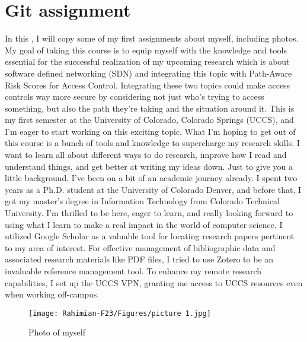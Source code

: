 \section{Git assignment}

\begin{text}
In this , I will copy some of my first assignments about myself, including photos. 
My goal of taking this course is to equip myself with the knowledge and tools essential for the successful realization of my upcoming research which is about software defined networking (SDN) and integrating this topic with Path-Aware Risk Scores for Access Control. Integrating these two topics could make access controls way more secure by considering not just who's trying to access something, but also the path they're taking and the situation around it.
This is my first semester at the University of Colorado, Colorado Springs (UCCS), and I'm eager to start working on this exciting topic. What I'm hoping to get out of this course is a bunch of tools and knowledge to supercharge my research skills. I want to learn all about different ways to do research, improve how I read and understand things, and get better at writing my ideas down.
Just to give you a little background, I've been on a bit of an academic journey already. I spent two years as a Ph.D. student at the University of Colorado Denver, and before that, I got my master's degree in Information Technology from Colorado Technical University.
I'm thrilled to be here, eager to learn, and really looking forward to using what I
learn to make a real impact in the world of computer science. 
I utilized Google Scholar as a valuable tool for locating research papers pertinent to my area of interest. For effective management of bibliographic data and associated research materials like PDF files, I tried to use Zotero to be an invaluable reference management tool. To enhance my remote research capabilities, I set up the UCCS VPN, granting me access to UCCS resources even when working off-campus.
\begin{figure}
    \center
    \texttt{[image: Rahimian-F23/Figures/picture 1.jpg]}
    \caption{Photo of myself}
\end{figure}


\end{text}
